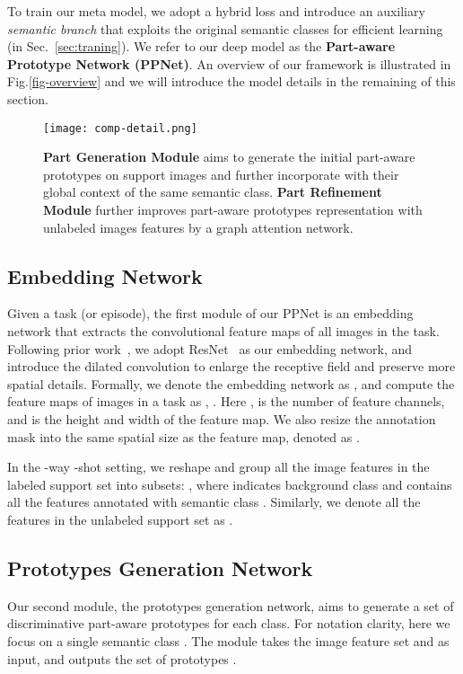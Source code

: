 \documentclass[runningheads]{llncs}
\begin{document}
To train our meta model, we adopt a hybrid loss and introduce an auxiliary \textit{semantic branch} that exploits the original semantic classes for efficient learning (in Sec.~\ref{sec:traning}). We refer to our deep model as the \textbf{Part-aware Prototype Network (PPNet)}. An overview of our framework is illustrated in Fig.\ref{fig-overview} and we will introduce the model details in the remaining of this section.

\begin{figure}[t]
    \centering
    \texttt{[image: comp-detail.png]}
    \caption{{\small \textbf{Part Generation Module}} aims to generate the initial part-aware prototypes on support images and further incorporate with their global context of the same semantic class. \textbf{Part Refinement Module} further improves part-aware prototypes representation with unlabeled images features by a graph attention network.}
\end{figure}


\subsection{Embedding Network}\label{sec:embedding}
Given a task (or episode), the first module of our PPNet is an embedding network that extracts the convolutional feature maps of all images in the task. Following prior work~\cite{zhang2019canet,zhang2019pyramid}, we adopt ResNet~\cite{he2016deep} as our embedding network, and introduce the dilated convolution to enlarge the receptive field and preserve more spatial details.
Formally, we denote the embedding network as , and compute the feature maps of images in a task  as , . Here ,  is the number of feature channels, and  is the height and width of the feature map. We also resize the annotation mask  into the same spatial size as the feature map, denoted as .

In the -way -shot setting, we reshape and group all the image features in the labeled support set  into  subsets: , where  indicates background class and  contains all the features  annotated with semantic class . 
Similarly, we denote all the features in the unlabeled support set  as . 


\subsection{Prototypes Generation Network}\label{sec:meta}
Our second module, the prototypes generation network, aims to generate a set of discriminative part-aware prototypes for each class. For notation clarity, here we focus on a single semantic class . The module takes the image feature set  and  as input, and outputs the set of prototypes . 
\end{document}
